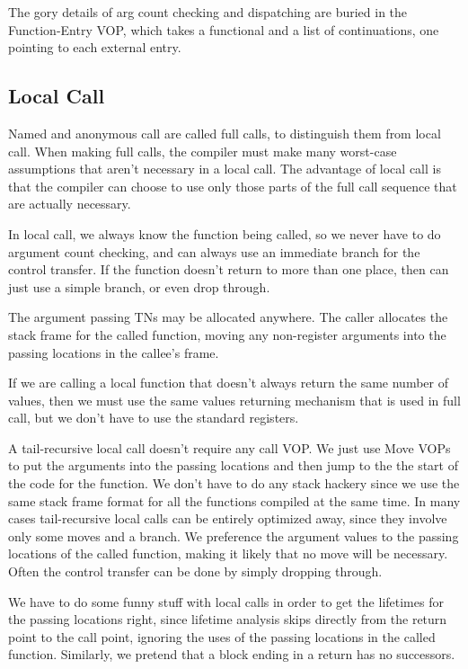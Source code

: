{\begin{itemize, spread 0, spacing 1}
The gory details of arg count checking and dispatching are buried in the
Function-Entry VOP, which takes a functional and a list of continuations, one
pointing to each external entry.


\subsection{Local Call}

Named and anonymous call are called full calls, to distinguish them from
local call.  When making full calls, the compiler must make many worst-case
assumptions that aren't necessary in a local call.  The advantage of local
call is that the compiler can choose to use only those parts of the full
call sequence that are actually necessary. 

In local call, we always know the function being called, so we never have
to do argument count checking, and can always use an immediate branch for
the control transfer.  If the function doesn't return to more than one
place, then can just use a simple branch, or even drop through.

The argument passing TNs may be allocated anywhere.  The caller allocates the
stack frame for the called function, moving any non-register arguments into the
passing locations in the callee's frame.

If we are calling a local function that doesn't always return the same
number of values, then we must use the same values returning mechanism that
is used in full call, but we don't have to use the standard registers.

A tail-recursive local call doesn't require any call VOP.  We just use Move
VOPs to put the arguments into the passing locations and then jump to the the
start of the code for the function.  We don't have to do any stack hackery
since we use the same stack frame format for all the functions compiled at the
same time.  In many cases tail-recursive local calls can be entirely optimized
away, since they involve only some moves and a branch.  We preference the
argument values to the passing locations of the called function, making it
likely that no move will be necessary.  Often the control transfer can be done
by simply dropping through.

We have to do some funny stuff with local calls in order to get the lifetimes
for the passing locations right, since lifetime analysis skips directly from
the return point to the call point, ignoring the uses of the passing locations
in the called function.  Similarly, we pretend that a block ending in a return
has no successors.


\end{itemize, spread 0, spacing 1}}
